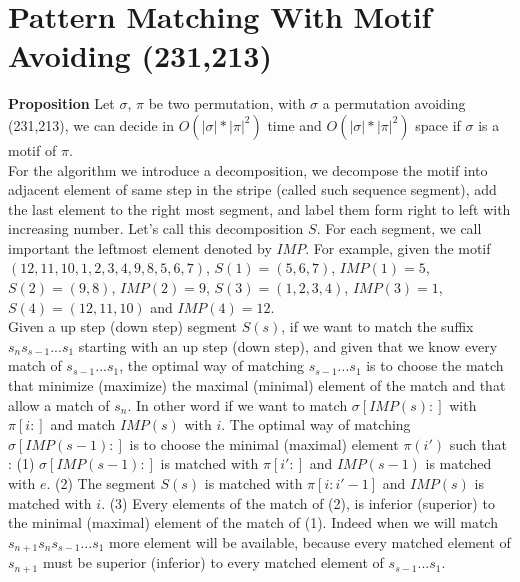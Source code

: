 \documentclass[12pt, a4paper]{article}
\newcommand{\ptext}{\pi}
\newcommand{\pmotif}{\sigma}
\newcounter{num}
\newcommand{\num}{\stepcounter{num} }
\begin{document}
		
		\section{Pattern Matching With Motif Avoiding (231,213)}	

			\textbf{Proposition  \num \thenum} Let $\pmotif$, $\ptext$ 
			be two permutation,
			with  $\pmotif$ a permutation avoiding (231,213), 
			we can decide in $O(|\pmotif|*|\ptext|^2)$ time
			and $O(|\pmotif|*|\ptext|^2)$ space
			if $\pmotif$ 
			is a motif of $\ptext$.\\
			
			
			For the algorithm we introduce a decomposition,
			we decompose the motif into
			adjacent element of same step in the stripe 
			(called such sequence segment),
			add the last element to the right most segment,
			and label them form right to left
			with increasing number.
			Let's call this decomposition $S$.
			For each segment, we call important 
			the leftmost element denoted by $IMP$.
			For example, given the motif $(12,11,10,1,2,3,4,9,8,5,6,7)$,
			$S(1)=(5,6,7)$, $IMP(1)=5$, 
			$S(2)=(9,8)$, $IMP(2)=9$, 
			$S(3)=(1,2,3,4)$, $IMP(3)=1$, 
			$S(4)=(12,11,10)$ and $IMP(4)=12$.\\
			
			Given a up step (down step) segment $S(s)$,
			if we want to
			match the suffix $s_ns_{s-1}...s_1$
			starting with an up step (down step),
			and given that we know every
			match of $s_{s-1}...s_1$,
			the optimal way of matching
			$s_{s-1}...s_1$
			is to choose the match
			that minimize (maximize)
			the maximal (minimal)
			element of the match
			and that allow a match
			of $s_n$.			
			In other word if we want to match 
			$\pmotif[IMP(s):]$
			with $\ptext[i:]$
			and match $IMP(s)$
			with $i$.
			The optimal way
			of matching
			$\pmotif[IMP(s-1):]$
			is to choose the
			minimal (maximal) element $\ptext(i')$
			such that :
			(1) $\pmotif[IMP(s-1):]$ is matched with $\ptext[i':]$
			and $IMP(s-1)$ is matched with $e$.
			(2) The segment $S(s)$ is matched with $\ptext[i:i'-1]$
			and $IMP(s)$ is matched with $i$.
			(3) Every elements of the match of (2),
			is inferior (superior) to the minimal (maximal) element of the match of (1).
			Indeed when we will 
			match $s_{n+1}s_ns_{s-1}...s_1$
			more element will be available,
			because every matched 
			element of $s_{n+1}$
			must be superior (inferior)
			to every matched element
			of $s_{s-1}...s_1$.\\
			  
\end{document}
